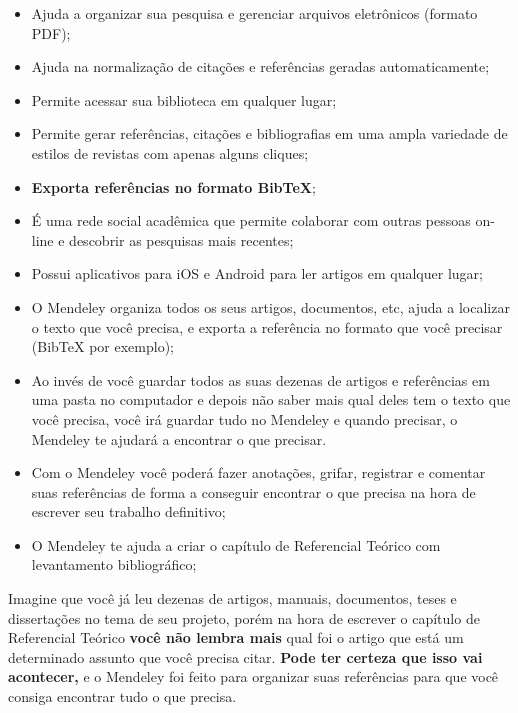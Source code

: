 \begin{itemize}
    \item Ajuda a organizar sua pesquisa e gerenciar arquivos eletrônicos (formato PDF);
    \item Ajuda na normalização de citações e referências geradas automaticamente;
    \item Permite acessar sua biblioteca em qualquer lugar;
    \item Permite gerar referências, citações e bibliografias em uma ampla variedade de estilos de revistas com apenas alguns cliques;
    \item {\bf Exporta referências no formato BibTeX};
    \item É uma rede social acadêmica que permite colaborar com outras pessoas on-line e descobrir as pesquisas mais recentes;
    \item Possui aplicativos para iOS e Android para ler artigos em qualquer lugar;
    \item O Mendeley organiza todos os seus artigos, documentos, etc, ajuda a localizar o texto que você precisa, e exporta a referência no formato que você precisar (BibTeX por exemplo);
    \item Ao invés de você guardar todos as suas dezenas de  artigos e referências em uma pasta no computador e depois não saber mais qual deles tem o texto que você precisa, você irá guardar tudo no Mendeley e quando precisar, o Mendeley te ajudará a encontrar o que precisar.
    \item Com o Mendeley você poderá fazer anotações, grifar, registrar e comentar suas referências de forma a conseguir encontrar o que precisa na hora de escrever seu trabalho definitivo;
    \item O Mendeley te ajuda a criar o capítulo de Referencial Teórico com levantamento bibliográfico;
\end{itemize}

\begin{CaixaVerde}
    Imagine que você já leu dezenas de artigos, manuais, documentos, teses e dissertações no tema de seu projeto, porém na hora de escrever o capítulo de Referencial Teórico {\bf você não lembra mais} qual foi o artigo que está um determinado assunto que você precisa citar. {\bf Pode ter certeza que isso vai acontecer,} e o Mendeley foi feito para organizar suas referências para que você consiga encontrar tudo o que precisa.
\end{CaixaVerde}

